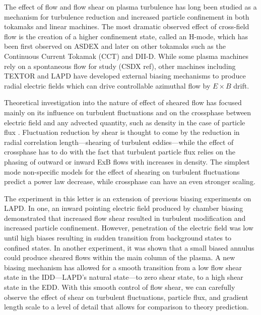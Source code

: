 \documentclass[%
 aps,
 prl,
 amsmath,amssymb,
 reprint,%
]{revtex4-1}
\begin{document}
\maketitle


	The effect of flow and flow shear on plasma turbulence has long been studied as a mechanism for turbulence reduction and increased particle confinement in both tokamaks and linear machines.  The most dramatic observed effect of cross-field flow is the creation of a higher confinement state, called an H-mode, which has been first observed on ASDEX\cite{wagner82} and later on other tokamaks such as the Continuous Current Tokamak (CCT)\cite{taylor89,tynan92} and DII-D\cite{groebner90,moyer95}. While some plasma machines rely on a spontaneous flow for study (CSDX ref), other machines including TEXTOR\cite{boedo00} and LAPD\cite{maggs07,carter09} have developed external biasing mechanisms to produce radial electric fields which can drive controllable azimuthal flow by $E \times B$ drift\cite{weynants93}.
	
Theoretical investigation into the nature of effect of sheared flow has focused mainly on its influence on turbulent fluctuations \cite{biglari90} and on the crossphase between electric field and any advected quantity, such as density in the case of particle flux \cite{ware96,terry01}. Fluctuation reduction by shear is thought to come by the reduction in radial correlation length---shearing of turbulent eddies---while the effect of crossphase has to do with the fact that turbulent particle flux relies on the phasing of outward or inward ExB flows with increases in density. The simplest mode non-specific models for the effect of shearing on turbulent fluctuations predict a power law decrease\cite{biglari90}, while crossphase can have an even stronger scaling\cite{terry01}.

The experiment in this letter is an extension of previous biasing experiments on LAPD. In one, an inward pointing electric field produced by chamber biasing demonstrated that increased flow shear resulted in turbulent modification and increased particle confinement\cite{carter09}. However, penetration of the electric field was low until high biases resulting in sudden transition from background states to confined states. In another experiment, it was shown that a small biased annulus could produce sheared flows within the main column of the plasma\cite{zhou12}. A new biasing mechanism has allowed for a smooth transition from a low flow shear state in the IDD---LAPD's natural state---to zero shear state, to a high shear state in the EDD. With this smooth control of flow shear, we can carefully observe the effect of shear on turbulent fluctuations, particle flux, and gradient length scale to a level of detail that allows for comparison to theory prediction.
\end{document}
